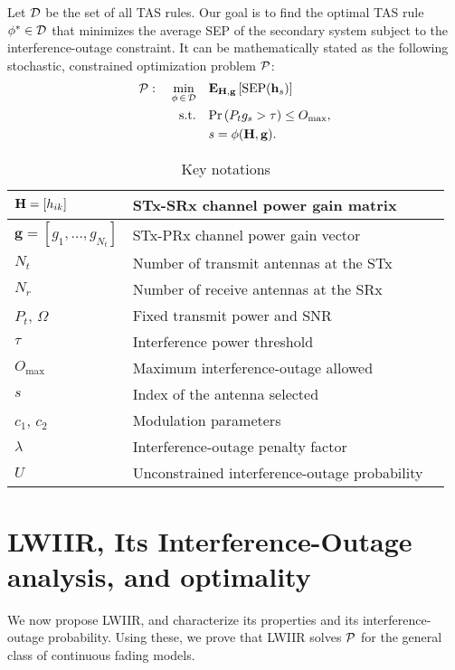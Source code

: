 \documentclass[journal]{IEEEtran}
\newcommand{\brac}[1]{\left({#1}\right)}
\newcommand{\mtx}[1]{{\bf #1}} %
\newcommand{\explow}[2]{{\bf{E}}_{#1}\left[{#2}\right]}
\newcommand{\prob}[1]{\text{Pr}\brac{#1}}
\newcommand{\SEP}{\text{SEP}}
\newcommand{\lam}{\lambda}
\newcommand{\Nt}{{N_t}}
\newcommand{\Nr}{{N_r}}
\newcommand{\Pt}{{P_t}}
\newcommand{\such}{h}
\newcommand{\puch}{g}
\newcommand{\hk}[1]{{\such_{#1}}}
\newcommand{\gk}[1]{{\puch_{#1}}}
\newcommand{\g}{\mathbf{\puch}}
\newcommand{\outmax}{O_{\text{max}}}
\newcommand{\itau}{\tau}
\newcommand{\cone}{c_{1}}
\newcommand{\ctwo}{c_{2}}
\newcommand{\snr}{\Omega}
\newcommand{\un}{U}
\newcommand{\asrule}{\phi}
\newcommand{\asspan}{{\cal D}}
\newcommand{\Hmx}{\mtx{H}}
\newcommand{\optproblem}{{\cal P}}
\newcommand{\hs}{\mathbf{\such}_{s}}
\begin{document}
Let $\asspan$ be the set of all TAS rules. Our goal is to find the optimal TAS rule $\phi^{*}\in\asspan$ that minimizes the average SEP of the secondary system subject to the interference-outage constraint. It can be mathematically stated as the  following stochastic, constrained optimization problem $\optproblem$:
\begin{align}
\label{eq:objective}
\optproblem: \quad \min_{\asrule\,\in\,\asspan} \quad
&\explow{\Hmx,\g}{\SEP(\hs)} \\
\label{eq:cons}
\text{s.t.} \quad &\prob{\Pt\gk{s}>\itau} \leq \outmax, \\
 &s = \phi(\Hmx,\g). 
\end{align}
%
\begin{center}
	\begin{table}
		\caption{Key notations}
		\label{tab:notations}
		\centering
		\begin{tabular}{l l l}
			\hline
			$\Hmx=[\hk{ik}]$                 & STx-SRx channel power gain matrix    \\ \hline
			$\g = [\gk{1},\ldots,\gk{\Nt}] $ & STx-PRx channel power gain vector    \\ \hline
			$\Nt$     		                 & Number of transmit antennas at the STx     \\ \hline
			$\Nr$            		         & Number of receive antennas at the SRx    \\ \hline
			$\Pt$, $\snr$                    & Fixed transmit power and SNR             \\ \hline
			$\itau$               & Interference power threshold     \\ \hline
			$\outmax$               &  Maximum interference-outage allowed    \\ \hline
			$s$                              & Index of the antenna selected      \\ \hline
			$\cone$, $\ctwo$                 & Modulation parameters         \\ \hline
			$\lam$                    & Interference-outage penalty factor  \\ \hline
			$\un$                    & Unconstrained interference-outage probability \\ \hline
		\end{tabular}
	\end{table}
\end{center}
%

\section{LWIIR, Its Interference-Outage analysis, and optimality}
\label{sec:analysis}
%
We now propose LWIIR, and characterize its properties and its interference-outage probability. Using these, we prove that LWIIR solves  $\optproblem$ for the general class of continuous fading models. 
\end{document}
